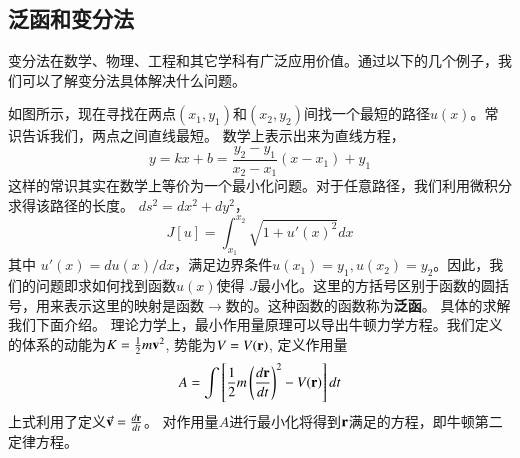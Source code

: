 \subsection{泛函和变分法}
\label{subsec:functional}
变分法在数学、物理、工程和其它学科有广泛应用价值。通过以下的几个例子，我们可以了解变分法具体解决什么问题。

如图所示，现在寻找在两点$(x_1, y_1)$和$(x_2,y_2)$间找一个最短的路径$u(x)$。常识告诉我们，两点之间直线最短。
数学上表示出来为直线方程，
\[
  y = k x + b = \frac{y_2 - y_1}{x_2 - x_1} ( x - x_1) + y_1  
\]
这样的常识其实在数学上等价为一个最小化问题。对于任意路径，我们利用微积分求得该路径的长度。
$ds^2 = dx^2 + dy^2$，
\[
J[u] = \int_{x_1}^{x_2} \sqrt{ 1 + u'(x)^2} dx    
\]
其中 $u'(x) = du(x)/dx$，满足边界条件$u(x_1) = y_1, u(x_2) = y_2$。因此，我们的问题即求如何找到函数$u(x)$使得
$J$最小化。这里的方括号区别于函数的圆括号，用来表示这里的映射是函数$\to$数的。这种函数的函数称为\textbf{泛函}。
具体的求解我们下面介绍。
理论力学上，最小作用量原理可以导出牛顿力学方程。我们定义的体系的动能为$K = {\frac{1}{2}} m {\mathbf{v}}^2$,
势能为$V = V({\mathbf{r}})$, 定义作用量
\begin{equation}
  A = \int \left[ {\frac{1}{2}} m \left( \frac{d{\mathbf{r}}}{dt} \right)^2 - V({\mathbf{r}}) \right] dt 
\end{equation}
上式利用了定义$\vec{{\mathbf{v}}} = \frac{d{\mathbf{r}}}{dt}$。 对作用量$A$进行最小化将得到${\mathbf{r}}$满足的方程，即牛顿第二定律方程。

